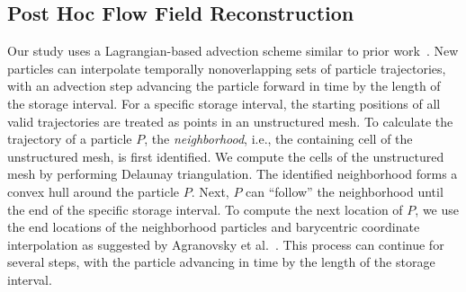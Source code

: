 \subsection{Post Hoc Flow Field Reconstruction}
Our study uses a Lagrangian-based advection scheme similar to prior work~\cite{agranovsky2014improved, sane2018revisiting, sane2019interpolation}.
%
New particles can interpolate temporally nonoverlapping sets of particle trajectories, with an advection step advancing the particle forward in time by the length of the storage interval.
%
%
%
%
For a specific storage interval, the starting positions of all valid trajectories are treated as points in an unstructured mesh.
%
To calculate the trajectory of a particle $P$, the \textit{neighborhood}, i.e., the containing cell of the unstructured mesh, is first identified.
%
We compute the cells of the unstructured mesh by performing Delaunay triangulation.
%
%
%
%
%
%
The identified neighborhood forms a convex hull around the particle $P$.
%
Next, $P$ can ``follow'' the neighborhood until the end of the specific storage interval.
%
To compute the next location of $P$, we use the end locations of the neighborhood particles and barycentric coordinate interpolation as suggested by Agranovsky et al.~\cite{agranovsky2015subsampling}.
%
This process can continue for several steps, with the particle advancing in time by the length of the storage interval.
%

%
